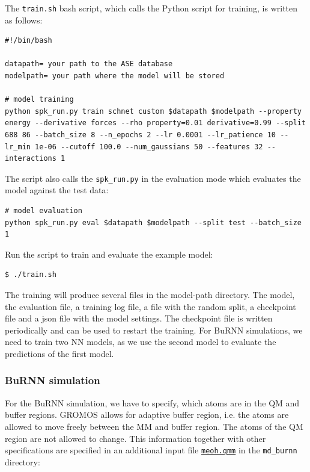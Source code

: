 The \texttt{train.sh} bash script, which calls the Python script for training, is written as follows:
\begin{lstlisting}[breaklines=true, breakatwhitespace=false]
#!/bin/bash

datapath= your path to the ASE database
modelpath= your path where the model will be stored

# model training
python spk_run.py train schnet custom $datapath $modelpath --property energy --derivative forces --rho property=0.01 derivative=0.99 --split 688 86 --batch_size 8 --n_epochs 2 --lr 0.0001 --lr_patience 10 --lr_min 1e-06 --cutoff 100.0 --num_gaussians 50 --features 32 --interactions 1
\end{lstlisting}


The script also calls the \texttt{spk\_run.py} in the evaluation mode which evaluates the model against the test data:

\begin{lstlisting}[breaklines=true, breakatwhitespace=false]
# model evaluation
python spk_run.py eval $datapath $modelpath --split test --batch_size 1
\end{lstlisting}


Run the script to train and evaluate the example model:

\begin{lstlisting}[breaklines=true, breakatwhitespace=false]
$ ./train.sh
\end{lstlisting}


The training will produce several files in the model-path directory. The model, the evaluation file, a training log file, a file with the random split, a checkpoint file and a json file with the model settings. The checkpoint file is written periodically and can be used to restart the training. For BuRNN simulations, we need to train two NN models, as we use the second model to evaluate the predictions of the first model.



\subsubsection{BuRNN simulation}

For the BuRNN simulation, we have to specify, which atoms are in the QM and buffer regions. GROMOS allows for adaptive buffer region, i.e. the atoms are allowed to move freely between the MM and buffer region. The atoms of the QM region are not allowed to change. This information together with other specifications are specified in an additional input file \href{https://github.com/LierB/gromos_tutorial_livecoms/blob/burnn_tutorial_rc/tutorial_files/t_06/md_burnn/meoh.qmm}{\texttt{meoh.qmm}} in the \texttt{md\_burnn} directory:

